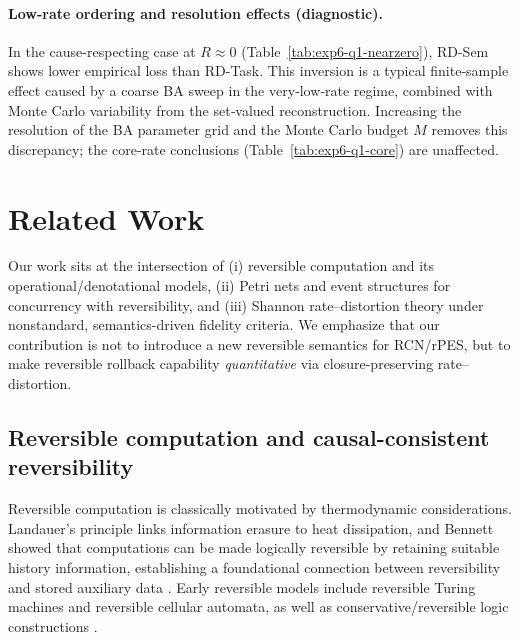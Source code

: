 \documentclass[twoside]{article}
\newcommand{\1}{\mathbf{1}}
\begin{document}
\paragraph{Low-rate ordering and resolution effects (diagnostic).}
In the cause-respecting case at \(R\approx 0\) (Table~\ref{tab:exp6-q1-nearzero}), RD-Sem shows lower empirical
loss than RD-Task.  This inversion is a typical finite‑sample effect caused by a coarse BA sweep in the very‑low‑rate
regime, combined with Monte Carlo variability from the set‑valued reconstruction.  Increasing the resolution of the
BA parameter grid and the Monte Carlo budget \(M\) removes this discrepancy; the core‑rate conclusions
(Table~\ref{tab:exp6-q1-core}) are unaffected.

\section{Related Work}
\label{sec:related}

Our work sits at the intersection of (i) reversible computation and its operational/denotational models,
(ii) Petri nets and event structures for concurrency with reversibility, and (iii) Shannon rate--distortion theory
under nonstandard, semantics-driven fidelity criteria.
We emphasize that our contribution is not to introduce a new reversible semantics for RCN/rPES,
but to make reversible rollback capability \emph{quantitative} via closure-preserving rate--distortion.

\subsection{Reversible computation and causal-consistent reversibility}

Reversible computation is classically motivated by thermodynamic considerations.
Landauer's principle links information erasure to heat dissipation, and Bennett showed that computations can be made logically reversible
by retaining suitable history information, establishing a foundational connection between reversibility and stored auxiliary data
\cite{landauer1961irreversibility,bennett1973logical,bennett1982thermodynamics}.
Early reversible models include reversible Turing machines and reversible cellular automata, as well as conservative/reversible logic
constructions \cite{toffoli1980reversible,toffoli1977computation,fredkin1982conservative}.
\end{document}
